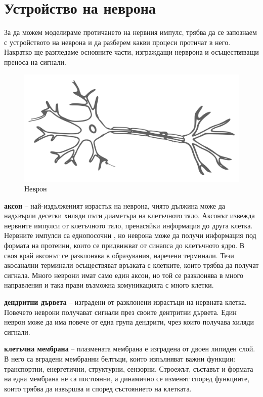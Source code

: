 \documentclass{article}
\numberwithin{equation}{section}
\begin{document}
\section{Устройство на неврона}
За да можем моделираме протичането на нервния импулс, трябва да се запознаем с устройството на неврона и да разберем какви процеси протичат в него. Накратко ще разгледаме основните части, изграждащи нерврона и осъществяващи преноса на сигнали.

\begin{figure}[H]
    \centering
    \includegraphics[scale=0.5]{./schemas/Neurona.png}
    \caption{Неврон}
\end{figure}

\textbf{аксон} -- най-издълженият израстък на неврона, чиято дължина може да надхвърли десетки хиляди пъти диаметъра на клетъчното тяло. Аксонът
извежда нервните импулси от клетъчното тяло, пренасяйки информация до друга клетка. Нервните импулси са еднопосочни , но неврона
може да получи информация под формата на протеини, които се придвижват от синапса до клетъчното ядро. В своя край аксонът се разклонява в
образувания, наречени терминали. Тези акосанални терминали осъществяват връзката с клетките, които трябва да получат сигнала.  Много неврони
имат само един аксон, но той се разклонява в много направления и така прави възможна комуникацията с много клетки.

\textbf{дендритни дървета} -- изградени от разклонени израстъци на нервната клетка. Повечето неврони получават сигнали през своите дентритни
дървета. Един неврон може да има повече от една група дендрити, чрез които получава хиляди сигнали.

\textbf{клетъчна мембрана} -- плазмената мембрана е изградена от двоен липиден слой. В него са вградени мембранни белтъци, които изпълняват
важни функции: транспортни, енергетични, структурни, сензорни. Строежът, съставът и формата на една мембрана не са постоянни, а динамично се
изменят според функциите, които трябва да извършва и според състоянието на клетката.
\end{document}
